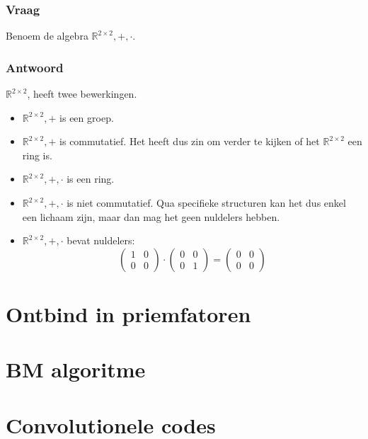 \documentclass[main.tex]{subfiles}
\begin{document}
\subsubsection{Vraag}
\begin{center}
  Benoem de algebra $\mathbb{R}^{2\times 2},+,\cdot$.
\end{center}

\subsubsection{Antwoord}
$\mathbb{R}^{2\times 2}$, heeft twee bewerkingen.

\begin{itemize}
\item $\mathbb{R}^{2\times 2},+$ is een groep.
\item $\mathbb{R}^{2\times 2},+$ is commutatief.
  Het heeft dus zin om verder te kijken of het $\mathbb{R}^{2 \times 2}$ een ring is.
\item $\mathbb{R}^{2\times 2},+,\cdot$ is een ring.
\item $\mathbb{R}^{2\times 2},+,\cdot$ is niet commutatief.
  Qua specifieke structuren kan het dus enkel een lichaam zijn, maar dan mag het geen nuldelers hebben.
\item $\mathbb{R}^{2\times 2},+,\cdot$ bevat nuldelers:
  \[
  \begin{pmatrix}
    1 & 0\\
    0 & 0
  \end{pmatrix}
  \cdot
  \begin{pmatrix}
    0 & 0\\
    0 & 1
  \end{pmatrix}
  =
  \begin{pmatrix}
    0 & 0\\
    0 & 0
  \end{pmatrix}
  \]
\end{itemize}





\newpage
\section{Ontbind in priemfatoren}

\section{BM algoritme}

\section{Convolutionele codes}
\end{document}
